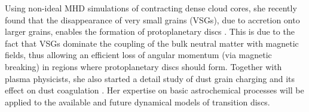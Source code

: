 \documentclass[10pt,fleqn,twoside]{article}
\begin{document}
Using non-ideal MHD simulations of contracting dense cloud cores, 
she recently found that the disappearance of very small grains (VSGs), 
due to accretion onto larger grains, enables the formation of 
protoplanetary discs \citep{2016MNRAS.460.2050Z}. This is due to the fact 
that VSGs dominate the coupling of the bulk neutral matter with magnetic 
fields, thus allowing an efficient loss of angular momentum (via magnetic 
breaking) in regions where protoplanetary discs should form. Together 
with plasma physicists, she also started a detail study of dust grain 
charging and its effect on dust coagulation \citep{2015ApJ...812..135I}.
Her expertise on basic astrochemical
processes will be applied to the available and future dynamical models
of transition discs. \\
\end{document}

